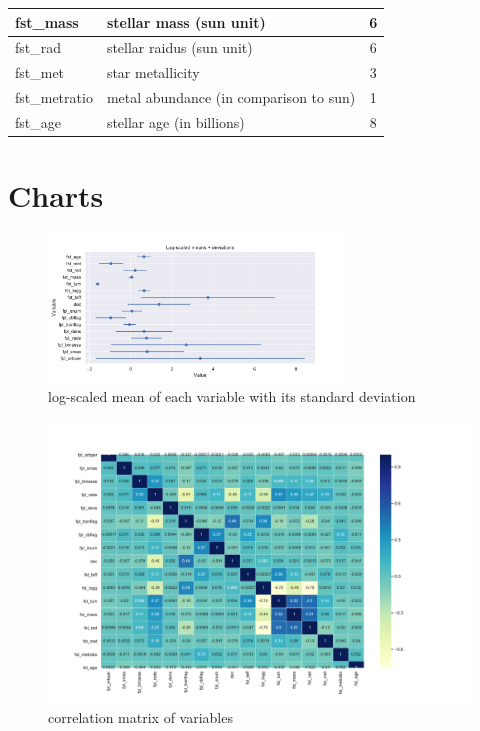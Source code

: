 \documentclass[12p]{article}
\begin{document}
\begin{landscape}
\begin{table}[!h]
\begin{tabular}{|l l c|}
            fst\_mass       & stellar mass (sun unit) & 6 \\ \hline
            fst\_rad         & stellar raidus (sun unit) & 6 \\ \hline
            fst\_met        & star metallicity & 3 \\ \hline
            fst\_metratio & metal abundance (in comparison to sun) & 1 \\ \hline
            fst\_age         & stellar age (in billions) & 8 \\ \hline
        \end{tabular}
    \end{table}
\end{landscape}

\section{Charts}

\begin{figure}[!ht]\centering
    \includegraphics[angle=90, width=0.7\textwidth]{graphics/mean_deviation.pdf}
    \caption{log-scaled mean of each variable with its standard deviation}
    \label{pic:mean}
\end{figure}

\begin{figure}[!ht]\centering
    \includegraphics[angle=90, width=1\textwidth]{graphics/correlation_matrix.pdf}
    \caption{correlation matrix of variables}
    \label{pic:corr}
\end{figure}
\end{document}
